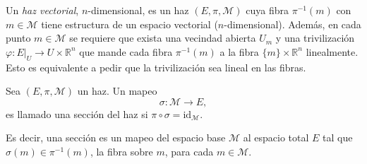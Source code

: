 \begin{mydef}  \cite{Baez}
Un \emph{haz vectorial}, $n$-dimensional, es un haz $(E, \pi, \mathcal{M})$ cuya fibra $\pi^{-1}(m)$ con $m \in \mathcal{M}$ tiene estructura de un espacio vectorial ($n$-dimensional). Adem\'{a}s, en cada punto $m \in \mathcal{M}$ se requiere que exista una vecindad abierta $U_{m}$ y una trivilizaci\'{o}n $\varphi: E \vert_{U} \longrightarrow U \times \mathbb{R}^{n}$ que mande cada fibra $\pi^{-1}(m)$ a la fibra $\{m\} \times \mathbb{R}^{n}$ linealmente. Esto es equivalente a pedir que la trivilizaci\'{o}n sea lineal en las fibras.
\end{mydef}


\begin{mydef}[Secci\'{o}n]  \cite{Baez}
Sea $(E, \pi, \mathcal{M})$ un haz. Un mapeo $$\sigma: \mathcal{M} \longrightarrow E,$$ es llamado una secci\'{o}n del haz si $\pi \circ \sigma = \mathrm{id}_{\mathcal{M}}$.
%
\begin{center}
\end{center}
%
Es decir, una secci\'{o}n es un mapeo del espacio base $\mathcal{M}$ al espacio total $E$ tal que $\sigma(m) \in \pi^{-1}(m)$, la fibra sobre $m$, para cada $m \in \mathcal{M}$.
\end{mydef}

